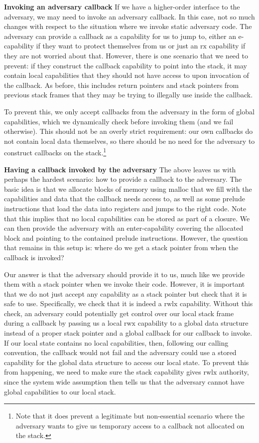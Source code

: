 \documentclass[compsoc,conference,letterpaper,fleqn]{IEEEtran}
\newcommand{\plainperm}[1]{\mathrm{#1}}
\newcommand{\exec}{\plainperm{rx}}
\newcommand{\entry}{\plainperm{e}}
\newcommand{\rwx}{\plainperm{rwx}}
\newcommand{\rwlx}{\plainperm{rwlx}}
\begin{document}
\textbf{Invoking an adversary callback} If we have a higher-order interface to
the adversary, we may need to invoke an adversary callback. In this case, not so
much changes with respect to the situation where we invoke static adversary
code. The adversary can provide a callback as a capability for us to jump to,
either an $\entry$-capability if they want to protect themselves from us or just
an $\exec$ capability if they are not worried about that. However, there is one
scenario that we need to prevent: if they construct the callback capability to
point into the stack, it may contain local capabilities that they should not
have access to upon invocation of the callback. As before, this includes return
pointers and stack pointers from previous stack frames that they may be
trying to illegally use inside the callback.

To prevent this, we only accept callbacks from the adversary in the form of
global capabilities, which we dynamically check before invoking them (and we
fail otherwise). This should not be an overly strict requirement: our own
callbacks do not contain local data themselves, so there should be no need for
the adversary to construct callbacks on the stack.\footnote{Note that it does
  prevent a legitimate but non-essential scenario where the adversary wants to
  give us temporary access to a callback not allocated on the stack.}

\textbf{Having a callback invoked by the adversary} The above leaves us with
perhaps the hardest scenario: how to provide a callback to the adversary. The
basic idea is that we allocate blocks of memory using malloc that we fill with
the capabilities and data that the callback needs access to, as well as some
prelude instructions that load the data into registers and jumps to the right
code. Note that this implies that no local capabilities can be stored as part of
a closure. We can then provide the adversary with an enter-capability covering
the allocated block and pointing to the contained prelude instructions. However,
the question that remains in this setup is: where do we get a stack pointer from when
the callback is invoked?

Our answer is that the adversary should provide it to us, much like we provide
them with a stack pointer when we invoke their code. However, it is important
that we do not just accept any capability as a stack pointer but check that it
is safe to use. Specifically, we check that it is indeed a $\rwlx$ capability. Without
this check, an adversary could potentially get control over our local stack
frame during a callback by passing us a local $\rwx$ capability to a global data
structure instead of a proper stack pointer
and a global callback for our callback to invoke. If our local state contains no
local capabilities, then, following our calling convention, the callback would
not fail and the adversary could use a stored capability for the global data
structure to access our local state. To prevent this from happening, we need to
make sure the stack capability gives $\rwlx$ authority, since the system wide assumption then
tells us that the adversary cannot have global capabilities to our local stack.
\end{document}
